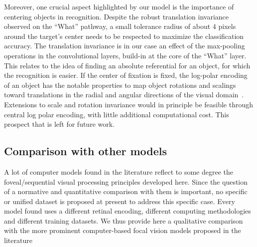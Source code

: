 Moreover, one crucial aspect highlighted by our model is the importance of centering objects in recognition. Despite the robust translation invariance observed on the ``What'' pathway, a small tolerance radius of about $4$ pixels around the target's center needs to be respected to maximize the classification accuracy. The translation invariance is in our case an effect of the max-pooling operations in the convolutional layers, build-in at the core of the ``What'' layer. 
This relates to the idea of finding an absolute referential for an object, for which the recognition is easier. If the center of fixation is fixed, the log-polar encoding of an object has the notable properties to map object rotations and scalings toward translations in the radial and angular directions of the visual domain~\cite{Traver10}. Extensions to scale and rotation invariance would in principle be feasible through central log polar encoding, with little additional  computational cost. This prospect that is left for future work. 



\subsection{Comparison with other models}

A lot of computer models found in the literature reflect to some degree the foveal/sequential visual processing principles developed here.
Since the question of a normative and quantitative comparison with them is important, no specific or unified dataset is proposed at present 
to address this specific case. Every model found uses a different retinal encoding, different computing methodologies and different training datasets.  
We thus provide here a qualitative comparison with the more prominent  computer-based focal vision models proposed in the literature  




